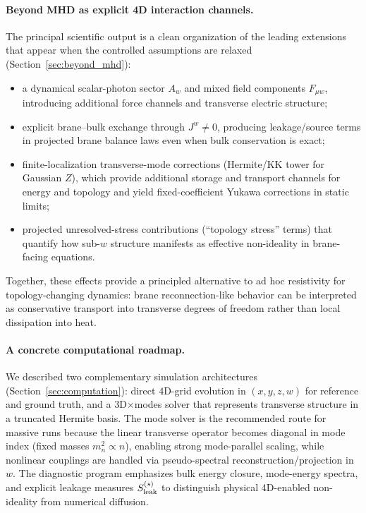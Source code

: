 \documentclass[11pt]{article}
\newcommand{\Z}{Z}              %
\newcommand{\Sleak}{S_{\rm leak}}
\begin{document}
\paragraph{Beyond MHD as explicit 4D interaction channels.}
The principal scientific output is a clean organization of the leading extensions that
appear when the controlled assumptions are relaxed (Section~\ref{sec:beyond_mhd}):
\begin{itemize}[leftmargin=1.7em]
\item a dynamical scalar-photon sector \(A_w\) and mixed field components \(F_{\mu w}\),
introducing additional force channels and transverse electric structure;
\item explicit brane--bulk exchange through \(J^w\neq 0\), producing leakage/source terms in
projected brane balance laws even when bulk conservation is exact;
\item finite-localization transverse-mode corrections (Hermite/KK tower for Gaussian \(\Z\)),
which provide additional storage and transport channels for energy and topology and yield
fixed-coefficient Yukawa corrections in static limits;
\item projected unresolved-stress contributions (``topology stress'' terms) that quantify
how sub-\(w\) structure manifests as effective non-ideality in brane-facing equations.
\end{itemize}
Together, these effects provide a principled alternative to ad hoc resistivity for
topology-changing dynamics: brane reconnection-like behavior can be interpreted as
conservative transport into transverse degrees of freedom rather than local dissipation
into heat.

\paragraph{A concrete computational roadmap.}
We described two complementary simulation architectures (Section~\ref{sec:computation}):
direct \(4\)D-grid evolution in \((x,y,z,w)\) for reference and ground truth, and a
3D\(\times\)modes solver that represents transverse structure in a truncated Hermite basis.
The mode solver is the recommended route for massive runs because the linear transverse
operator becomes diagonal in mode index (fixed masses \(m_n^2\propto n\)), enabling strong
mode-parallel scaling, while nonlinear couplings are handled via pseudo-spectral
reconstruction/projection in \(w\). The diagnostic program emphasizes bulk energy closure,
mode-energy spectra, and explicit leakage measures \(\Sleak^{(s)}\) to distinguish physical
4D-enabled non-ideality from numerical diffusion.
\end{document}
